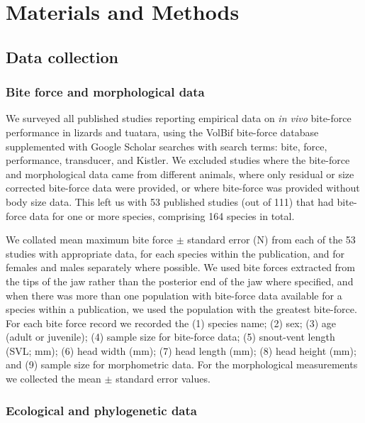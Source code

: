 \documentclass[a4paper, 12pt]{article}
\begin{document}

\section{Materials and Methods}

\subsection{Data collection}

\subsubsection{Bite force and morphological data}
We surveyed all published studies reporting empirical data on \textit{in vivo} bite-force performance in lizards and tuatara, using the VolBif bite-force database \cite{lappin2014reliable} supplemented with Google Scholar searches with search terms: bite, force, performance, transducer, and Kistler. 
We excluded studies where the bite-force and morphological data came from different animals, where only residual or size corrected bite-force data were provided, or where bite-force was provided without body size data. 
This left us with 53 published studies (out of 111) that had bite-force data for one or more species, comprising 164 species in total. 

We collated mean maximum bite force $\pm$ standard error (N) from each of the 53 studies with appropriate data, for each species within the publication, and for females and males separately where possible. 
We used bite forces extracted from the tips of the jaw rather than the posterior end of the jaw where specified\cite{lappin2014reliable}, and when there was more than one population with bite-force data available for a species within a publication, we used the population with the greatest bite-force. 
For each bite force record we recorded the (1) species name; (2) sex; (3) age (adult or juvenile); (4) sample size for bite-force data; (5) snout-vent length (SVL; mm); (6) head width (mm); (7) head length (mm); (8) head height (mm); and (9) sample size for morphometric data. 
For the morphological measurements we collected the mean $\pm$ standard error values. 

\subsubsection{Ecological and phylogenetic data}
\end{document}
